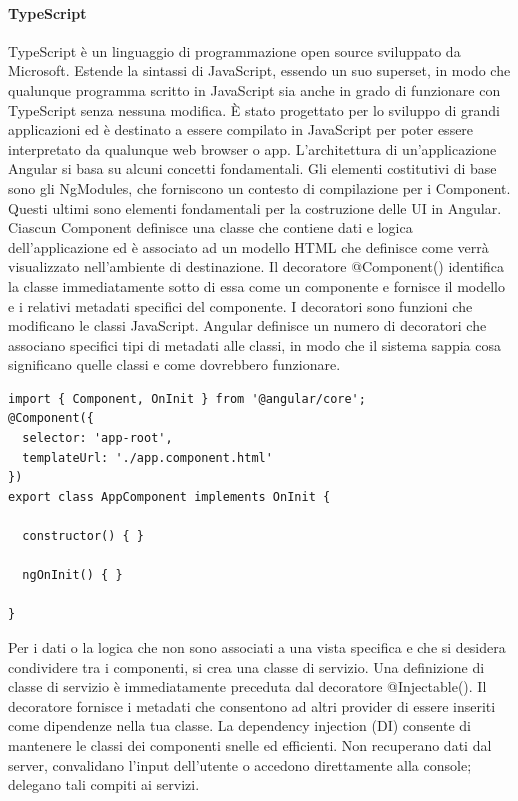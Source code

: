 \paragraph{TypeScript} TypeScript è un linguaggio di programmazione open source sviluppato da Microsoft. Estende la sintassi di JavaScript, essendo un suo superset, in modo che qualunque programma scritto in JavaScript sia anche in grado di funzionare con TypeScript senza nessuna modifica. È stato progettato per lo sviluppo di grandi applicazioni ed è destinato a essere compilato in JavaScript per poter essere interpretato da qualunque web browser o app. \cite{TYPESCRIPT}
L'architettura di un'applicazione Angular si basa su alcuni concetti fondamentali. Gli elementi costitutivi di base sono gli NgModules, che forniscono un contesto di compilazione per i Component. Questi ultimi sono elementi fondamentali per la costruzione delle UI in Angular. Ciascun Component definisce una classe che contiene dati e logica dell'applicazione ed è associato ad un modello HTML che definisce come verrà visualizzato nell'ambiente di destinazione. Il decoratore @Component() identifica la classe immediatamente sotto di essa come un componente e fornisce il modello e i relativi metadati specifici del componente.
I decoratori sono funzioni che modificano le classi JavaScript. Angular definisce un numero di decoratori che associano specifici tipi di metadati alle classi, in modo che il sistema sappia cosa significano quelle classi e come dovrebbero funzionare.\cite{ANGULAR}
\begin{lstlisting}[caption={Esempio di un Component in Angular}, style=javaScriptCode]
import { Component, OnInit } from '@angular/core';
@Component({
  selector: 'app-root',
  templateUrl: './app.component.html'
})
export class AppComponent implements OnInit {

  constructor() { }

  ngOnInit() { }
  
}
\end{lstlisting}
Per i dati o la logica che non sono associati a una vista specifica e che si desidera condividere tra i componenti, si crea una classe di servizio. Una definizione di classe di servizio è immediatamente preceduta dal decoratore @Injectable(). Il decoratore fornisce i metadati che consentono ad altri provider di essere inseriti come dipendenze nella tua classe.
La dependency injection (DI) consente di mantenere le classi dei componenti snelle ed efficienti. Non recuperano dati dal server, convalidano l'input dell'utente o accedono direttamente alla console; delegano tali compiti ai servizi. \cite{ANGULAR}
